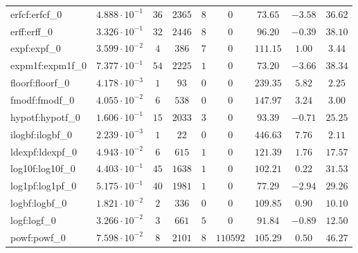 \begin{tabular}{|l|c|c|c|c|c|c|c|c|}
erfcf:erfcf\_0               & $ 4.888 \cdot 10^{-1} $ & $ 36     $ & $ 2365  $ & $ 8   $ & $ 0      $ & $ 73.65       $ & $ -3.58   $ & $ 36.62   $ \\
erff:erff\_0                 & $ 3.326 \cdot 10^{-1} $ & $ 32     $ & $ 2446  $ & $ 8   $ & $ 0      $ & $ 96.20       $ & $ -0.39   $ & $ 38.10   $ \\
expf:expf\_0                 & $ 3.599 \cdot 10^{-2} $ & $ 4      $ & $ 386   $ & $ 7   $ & $ 0      $ & $ 111.15      $ & $ 1.00    $ & $ 3.44    $ \\
expm1f:expm1f\_0             & $ 7.377 \cdot 10^{-1} $ & $ 54     $ & $ 2225  $ & $ 1   $ & $ 0      $ & $ 73.20       $ & $ -3.66   $ & $ 38.34   $ \\
floorf:floorf\_0             & $ 4.178 \cdot 10^{-3} $ & $ 1      $ & $ 93    $ & $ 0   $ & $ 0      $ & $ 239.35      $ & $ 5.82    $ & $ 2.25    $ \\
fmodf:fmodf\_0               & $ 4.055 \cdot 10^{-2} $ & $ 6      $ & $ 538   $ & $ 0   $ & $ 0      $ & $ 147.97      $ & $ 3.24    $ & $ 3.00    $ \\
hypotf:hypotf\_0             & $ 1.606 \cdot 10^{-1} $ & $ 15     $ & $ 2033  $ & $ 3   $ & $ 0      $ & $ 93.39       $ & $ -0.71   $ & $ 25.25   $ \\
ilogbf:ilogbf\_0             & $ 2.239 \cdot 10^{-3} $ & $ 1      $ & $ 22    $ & $ 0   $ & $ 0      $ & $ 446.63      $ & $ 7.76    $ & $ 2.11    $ \\
ldexpf:ldexpf\_0             & $ 4.943 \cdot 10^{-2} $ & $ 6      $ & $ 615   $ & $ 1   $ & $ 0      $ & $ 121.39      $ & $ 1.76    $ & $ 17.57   $ \\
log10f:log10f\_0             & $ 4.403 \cdot 10^{-1} $ & $ 45     $ & $ 1638  $ & $ 1   $ & $ 0      $ & $ 102.21      $ & $ 0.22    $ & $ 31.53   $ \\
log1pf:log1pf\_0             & $ 5.175 \cdot 10^{-1} $ & $ 40     $ & $ 1981  $ & $ 1   $ & $ 0      $ & $ 77.29       $ & $ -2.94   $ & $ 29.26   $ \\
logbf:logbf\_0               & $ 1.821 \cdot 10^{-2} $ & $ 2      $ & $ 336   $ & $ 0   $ & $ 0      $ & $ 109.85      $ & $ 0.90    $ & $ 10.10   $ \\
logf:logf\_0                 & $ 3.266 \cdot 10^{-2} $ & $ 3      $ & $ 661   $ & $ 5   $ & $ 0      $ & $ 91.84       $ & $ -0.89   $ & $ 12.50   $ \\
powf:powf\_0                 & $ 7.598 \cdot 10^{-2} $ & $ 8      $ & $ 2101  $ & $ 8   $ & $ 110592 $ & $ 105.29      $ & $ 0.50    $ & $ 46.27   $ \\

\end{tabular}
